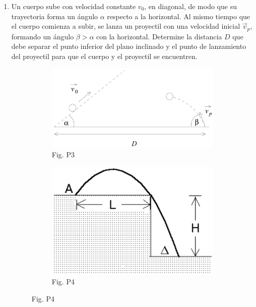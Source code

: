\documentclass[letterpaper,11pt]{article}
\begin{document}
\begin{enumerate}
{\begin{multicols}{2}
        \columnbreak
        
        \begin{figure}[H]
            \centering
            
        \end{figure}
        
    \end{multicols}
}

\item Un cuerpo sube con velocidad constante $v_0$, en diagonal, de modo que su trayectoria forma un ángulo $\alpha$ respecto a la horizontal. Al mismo tiempo que el cuerpo comienza a subir, se lanza un proyectil con una velocidad inicial $\vec{v}_p$, formando un ángulo $\beta > \alpha$ con la horizontal.  Determine la distancia $D$ que debe separar el punto inferior del plano inclinado y el punto de lanzamiento del proyectil para que el cuerpo y el proyectil se encuentren.

\begin{figure}[h!]
    \centering
    \begin{subfigure}[t]{0.4\textwidth}
        \centering
        \includegraphics[width=0.86\linewidth]{2022-1/img/aux2/colision.PNG}
        \caption*{Fig. P3}
    \end{subfigure}
    \hspace{0.5cm}
    \begin{subfigure}[t]{0.4\textwidth}
        \centering
        \includegraphics[width=0.6\linewidth]{2022-1/img/aux2/peldanio.PNG}
        \caption*{Fig. P4}
    \end{subfigure}
\end{figure}



\end{enumerate}
\end{document}
